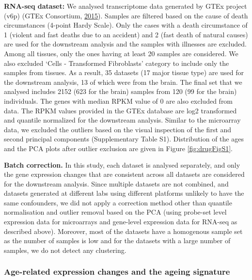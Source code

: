\documentclass[12pt,twoside]{unicam}
\begin{document}
\textbf{RNA-seq dataset:} We analysed transcriptome data generated by GTEx project (v6p) (GTEx Consortium, \protect\hyperlink{ref-GTEx_Consortium2015}{2015}). Samples are filtered based on the cause of death circumstances (4-point Hardy Scale). Only the cases with a death circumstance of 1 (violent and fast deaths due to an accident) and 2 (fast death of natural causes) are used for the downstream analysis and the samples with illnesses are excluded. Among all tissues, only the ones having at least 20 samples are considered. We also excluded `Cells - Transformed Fibroblasts' category to include only the samples from tissues. As a result, 35 datasets (17 major tissue type) are used for the downstream analysis, 13 of which were from the brain. The final set that we analysed includes 2152 (623 for the brain) samples from 120 (99 for the brain) individuals. The genes with median RPKM value of 0 are also excluded from data. The RPKM values provided in the GTEx database are log2 transformed and quantile normalized for the downstream analysis. Similar to the microarray data, we excluded the outliers based on the visual inspection of the first and second principal components (Supplementary Table S1). Distribution of the ages and the PCA plots after outlier exclusion are given in Figure \ref{fig:drugFigS1}.

\textbf{Batch correction.} In this study, each dataset is analysed separately, and only the gene expression changes that are consistent across all datasets are considered for the downstream analysis. Since multiple datasets are not combined, and datasets generated at different labs using different platforms unlikely to have the same confounders, we did not apply a correction method other than quantile normalisation and outlier removal based on the PCA (using probe-set level expression data for microarrays and gene-level expression data for RNA-seq as described above). Moreover, most of the datasets have a homogenous sample set as the number of samples is low and for the datasets with a large number of samples, we do not detect any clustering.

\hypertarget{ageingSignatureMethods}{%
\subsubsection{Age-related expression changes and the ageing signature}\label{ageingSignatureMethods}}
\end{document}
